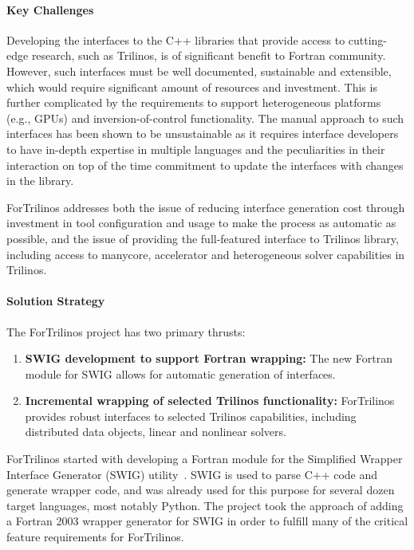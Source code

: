 \paragraph{Key Challenges}

Developing the interfaces to the C++ libraries that provide access to cutting-edge research, such as Trilinos,  is of significant benefit to Fortran community. However, such interfaces must be well documented, sustainable and extensible, which would require significant amount of resources and investment. This is further complicated by the requirements to support heterogeneous platforms (e.g., GPUs) and inversion-of-control functionality. The manual approach to such interfaces has been shown to be unsustainable as it requires interface developers to have in-depth expertise in  multiple languages and the peculiarities in their interaction on top of the time commitment to update the interfaces with changes in the library.

ForTrilinos addresses both the issue of reducing interface generation cost through investment in tool configuration and usage to make the process as automatic as possible, and the issue of providing the full-featured interface to Trilinos library, including access to manycore, accelerator and heterogeneous solver capabilities in Trilinos.

\paragraph{Solution Strategy}

The ForTrilinos project has two primary thrusts:
\begin{enumerate}
  \item \textbf{SWIG development to support Fortran wrapping:} The new Fortran
    module for SWIG allows for automatic generation of interfaces.
  \item \textbf{Incremental wrapping of selected Trilinos functionality:}
    ForTrilinos provides robust interfaces to selected Trilinos capabilities,
    including distributed data objects, linear and nonlinear solvers.
\end{enumerate}

ForTrilinos started with developing a Fortran module for the Simplified Wrapper Interface Generator (SWIG) utility~\cite{beazley1996swig}. SWIG is used to parse C++ code and generate wrapper code, and was already used for this purpose for several dozen target languages, most notably Python. The project took the approach of adding a Fortran 2003 wrapper generator for SWIG in order to fulfill many of the critical feature requirements for ForTrilinos.

